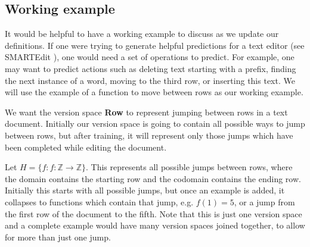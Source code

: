 \documentclass{article}
\theoremstyle{definition}
\begin{document}
%
%

\subsection{Working example}
It would be helpful to have a working example to discuss as we update our definitions. If one were trying to generate helpful predictions for a text editor (see SMARTEdit \cite{short}), one would need a set of operations to predict. For example, one may want to predict actions such as deleting text starting with a prefix, finding the next instance of a word, moving to the third row, or inserting this text. We will use the example of a function to move between rows as our working example. 

We want the version space \textbf{Row} to represent jumping between rows in a text document. Initially our version space is going to contain all possible ways to jump between rows, but after training, it will represent only those jumps which have been completed while editing the document. 

Let $H = \{f: f: \mathbb{Z} \rightarrow \mathbb{Z}\}$. This represents all possible jumps between rows, where the domain contains the starting row and the codomain contains the ending row. Initially this starts with all possible jumps, but once an example is added, it collapses to functions which contain that jump, e.g. $f(1) = 5$, or a jump from the first row of the document to the fifth. Note that this is just one version space and a complete example would have many version spaces joined together, to allow for more than just one jump. 
\end{document}
